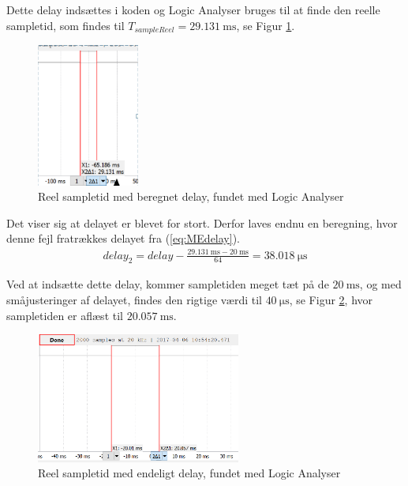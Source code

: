 Dette delay indsættes i koden og Logic Analyser bruges til at finde den reelle sampletid, som findes til $T_{sampleReel} = \SI{29,131}{\milli\second}$, se Figur \ref{fig:MEsampleTest1}.

\begin{figure}[htbp] %
	\centering
	\includegraphics[width=0.3\textwidth]{Figure/MEtestSample1}
	\caption{Reel sampletid med beregnet delay, fundet med Logic Analyser}
	\label{fig:MEsampleTest1}
\end{figure}

Det viser sig at delayet er blevet for stort. Derfor laves endnu en beregning, hvor denne fejl fratrækkes delayet fra (\ref{eq:MEdelay}).
\begin{align}
delay_2 = delay - \frac{\SI{29.131}{\milli\second}-\SI{20}{\milli\second}}{64} = \SI{38,018} {\micro\second}
\end{align}

Ved at indsætte dette delay, kommer sampletiden meget tæt på de $\SI{20}{\milli\second}$, og med småjusteringer af delayet, findes den rigtige værdi til $\SI{40}{\micro\second}$, se Figur \ref{fig:MEsampleTest2}, hvor sampletiden er aflæst til $\SI{20,057}{\milli\second}$.

\begin{figure}[htbp] %
	\centering
	\includegraphics[width=0.6\textwidth]{Figure/MEtestSample2}
	\caption{Reel sampletid med endeligt delay, fundet med Logic Analyser}
	\label{fig:MEsampleTest2}
\end{figure}


